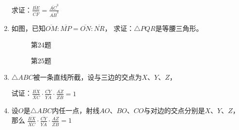 \begin{enumerate}
求证：$\frac{\overline{BE}}{\overline{CF}}=\frac{\overline{AC}^3}{\overline{AB}^3}$

\item 如图，已知$\overline{OM}:\overline{MP}=\overline{ON}:\overline{NR}$，
求证：$\triangle PQR$是等腰三角形。

\begin{figure}
    \begin{minipage}[t]{0.48\linewidth}
    \centering
\begin{tikzpicture}[>=latex, scale=.8]
    \end{tikzpicture}
    \caption*{第24题}
    \end{minipage}
    \begin{minipage}[t]{0.48\linewidth}
    \centering
    \begin{tikzpicture}[>=latex, scale=1]
    \end{tikzpicture}
    \caption*{第25题}
    \end{minipage}
    \end{figure}

\item $\triangle ABC$被一条直线所截，设与三边的交点为$X$、$Y$、$Z$，

试证：$\frac{\overline{BX}}{\overline{XC}}\cdot \frac{\overline{CY}}{\overline{YA}}\cdot \frac{\overline{AZ}}{\overline{ZB}}=1$

\item 设$O$是$\triangle ABC$内任一点，射线$AO$、$BO$、$CO$与对边的交点分别是$X$、$Y$、$Z$，那么
$\frac{\overline{BX}}{\overline{XC}}\cdot \frac{\overline{CY}}{\overline{YA}}\cdot \frac{\overline{AZ}}{\overline{ZB}}=1$



\end{enumerate}
